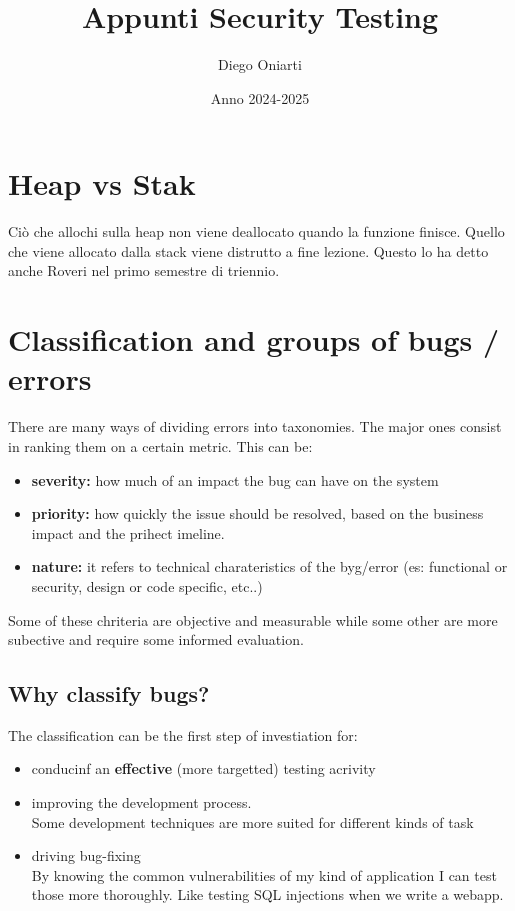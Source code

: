 \documentclass{article}
\title{Appunti Security Testing}
\author{Diego Oniarti}
\date{Anno 2024-2025}
\begin{document}
\maketitle
\tableofcontents

\section{Heap vs Stak}
Ciò che allochi sulla heap non viene deallocato quando la funzione finisce. Quello che viene allocato dalla stack viene distrutto a fine lezione. Questo lo ha detto anche Roveri nel primo semestre di triennio.

\section{Classification and groups of bugs / errors}
There are many ways of dividing errors into taxonomies. The major ones consist in ranking them on a certain metric. This can be:
\begin{itemize}
    \item \textbf{severity:} how much of an impact the bug can have on the system
    \item \textbf{priority:} how quickly the issue should be resolved, based on the business impact and the prihect imeline.
    \item \textbf{nature:} it refers to technical charateristics of the byg/error (es: functional or security, design or code specific, etc..)
\end{itemize}
Some of these chriteria are objective and measurable while some other are more subective and require some informed evaluation.

\subsection{Why classify bugs?}
The classification can be the first step of investiation for:
\begin {itemize}
    \item conducinf an \textbf{effective} (more targetted) testing acrivity
    \item improving the development process. \\ 
        Some development techniques are more suited for different kinds of task
    \item driving bug-fixing \\
        By knowing the common vulnerabilities of my kind of application I can test those more thoroughly. Like testing SQL injections when we write a webapp.
\end {itemize}
\end{document}

